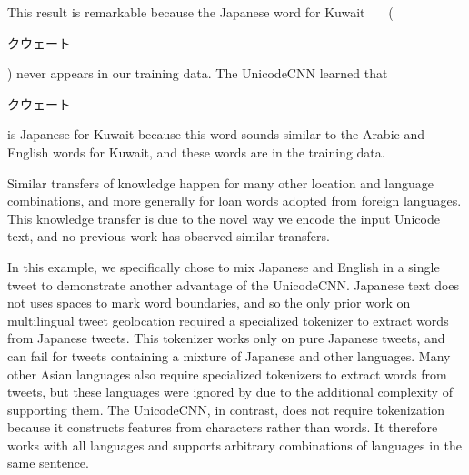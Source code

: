 \documentclass[sigconf,anonymous,review]{acmart}
\newcommand{\defn}[1]{\textit{#1}}
\newcommand{\ignore}[1]{}
\newcommand{\fixme}[1]{\textcolor{red}{\textbf{FIXME:} {#1}}}
\begin{document}
\begin{description}
\noindent
This result is remarkable because the Japanese word for Kuwait ~~~(\begin{CJK}{UTF8}{min}クウェート\end{CJK}) never appears in our training data.
The UnicodeCNN learned that \begin{CJK}{UTF8}{min}クウェート\end{CJK} is Japanese for Kuwait because this word sounds similar to the Arabic and English words for Kuwait,
    and these words are in the training data.
    \ignore{
Furthermore, if we misspell the Japanese word for Kuwait (for example as \begin{CJK}{UTF8}{min}ウェート\end{CJK}),
then the UnicodeCNN still understands that the location referred to is Kuwait.
The model's output in this case is
\noindent
}
\noindent
Similar transfers of knowledge happen for many other location and language combinations,
and more generally for loan words adopted from foreign languages.
This knowledge transfer is due to the novel way we encode the input Unicode text,
and no previous work has observed similar transfers.

In this example, we specifically chose to mix Japanese and English in a single tweet to demonstrate another advantage of the UnicodeCNN.
Japanese text does not uses spaces to mark word boundaries, 
and so the only prior work on multilingual tweet geolocation \citep{han2014text} required a specialized tokenizer to extract words from Japanese tweets.
This tokenizer works only on pure Japanese tweets,
and can fail for tweets containing a mixture of Japanese and other languages.
Many other Asian languages also require specialized tokenizers to extract words from tweets,
but these languages were ignored by \citep{han2014text} due to the additional complexity of supporting them.
The UnicodeCNN, in contrast, does not require tokenization because it constructs features from characters rather than words.
It therefore works with all languages and supports arbitrary combinations of languages in the same sentence.


\end{description}
\end{document}
